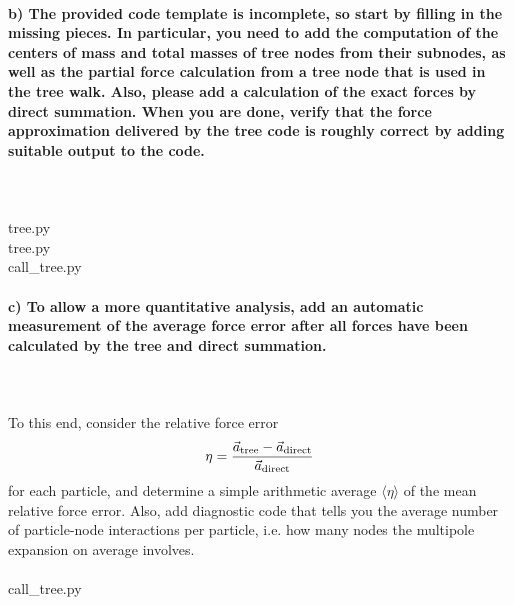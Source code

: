 \paragraph{b)
    The provided code template is incomplete, so start by filling 
    in the missing pieces. In particular, you need to add the 
    computation of the centers of mass and total masses of tree 
    nodes from their subnodes, as well as the partial force 
    calculation from a tree node that is used in the tree walk. 
    Also, please add a calculation of the exact forces by 
    direct summation. When you are done, verify that the force 
    approximation delivered by the tree code is roughly correct 
    by adding suitable output to the code.
} \ \\
    \\
    tree.py
     \ \\
    \newpage
    tree.py
     \ \\
    call\_tree.py
    

\newpage
\paragraph{c)
    To allow a more quantitative analysis, add an automatic 
    measurement of the average force error after all forces 
    have been calculated by the tree and direct summation.
} \ \\ 
    \\
    To this end, consider the relative force error
    \begin{equation}
        \eta
        =\frac{\vec{a}_\textnormal{tree}-
        \vec{a}_\textnormal{direct}}{\vec{a}_\textnormal{direct}}
    \end{equation}
    for each particle, and determine a simple arithmetic average 
    $\langle\eta\rangle$ of the mean relative force error. Also, 
    add diagnostic code that tells you the average number of 
    particle-node interactions per particle, i.e. how many nodes 
    the multipole expansion on average involves. \ \\
    \\
    call\_tree.py
    


\newpage
